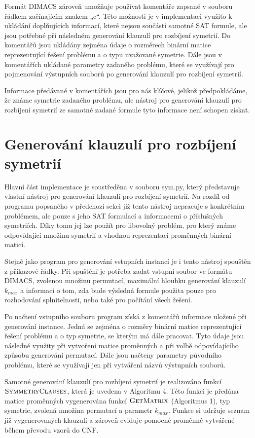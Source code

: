 Formát DIMACS zároveň umožňuje používat komentáře zapsané v souboru řádkem začínajícím znakem „c“. Této možnosti je v implementaci využito k ukládání doplňujících informací, které nejsou součástí samotné SAT formule, ale jsou potřebné při následném generování klauzulí pro rozbíjení symetrií. Do komentářů jsou ukládány zejména údaje o rozměrech binární matice reprezentující řešení problému a o typu uvažované symetrie. Dále jsou v komentářích ukládané parametry zadaného problému, které se využívají pro pojmenování výstupních souborů po generování klauzulí pro rozbíjení symetrií.

Informace předávané v komentářích jsou pro nás klíčové, jelikož předpokládáme, že známe symetrie zadaného problému, ale nástroj pro generování klauzulí pro rozbíjení symetrií ze samotné zadané formule tyto informace není schopen získat.

\section{Generování klauzulí pro rozbíjení symetrií}

Hlavní část implementace je soustředěna v souboru sym.py, který představuje vlastní nástroj pro generování klauzulí pro rozbíjení symetrií. Na rozdíl od programu popsaného v předchozí sekci již tento nástroj nepracuje s konkrétním problémem, ale pouze s jeho SAT formulací a informacemi o příslušných symetriích. Díky tomu jej lze použít pro libovolný problém, pro který známe odpovídající množinu symetrií a vhodnou reprezentaci proměnných binární maticí.

Stejně jako program pro generování vstupních instancí je i tento nástroj spouštěn z příkazové řádky. Při spuštění je potřeba zadat vstupní soubor ve formátu DIMACS, zvolenou množinu permutací, maximální hloubku generování klauzulí $k_{max}$ a informaci o tom, zda bude výsledná formule použita pouze pro rozhodování splnitelnosti, nebo také pro počítání všech řešení.

Po načtení vstupního souboru program získá z komentářů informace uložené při generování instance. Jedná se zejména o rozměry binární matice reprezentující řešení problému a o typ symetrie, se kterým má dále pracovat. Tyto údaje jsou následně využity při vytvoření matice proměnných a při volbě odpovídajícího způsobu generování permutací. Dále jsou načteny parametry původního problému, které se využívají jen při vytváření názvů výstupních souborů.

Samotné generování klauzulí pro rozbíjení symetrií je realizováno funkcí $\textproc{SymmetryClauses}$, která je uvedena v Algoritmu 4. Této funkci je předána matice proměnných vygenerována funkcí $\textproc{GetMatrix}$ (Algoritmus 1), typ symetrie, zvolená množina permutací a parametr $k_{max}$. Funkce si udržuje seznam již vygenerovaných klauzulí a zároveň eviduje pomocné proměnné vytvářené během převodu vzorů do CNF.

